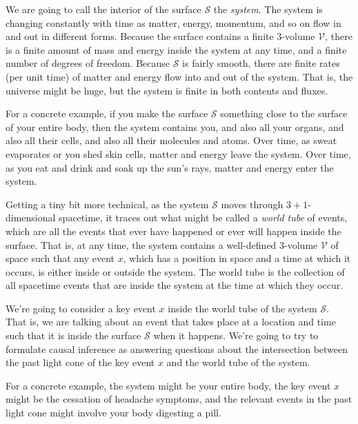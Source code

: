 \documentclass[12pt]{article}
\begin{document}
We are going to call the interior of the surface $\mathcal S$ the \emph{system}.
The system is changing constantly with time as matter, energy, momentum, and so on flow in and out in different forms.
Because the surface contains a finite 3-volume $\mathcal V$, there is a finite amount of mass and energy inside the system at any time, and a finite number of degrees of freedom.
Because $\mathcal S$ is fairly smooth, there are finite rates (per unit time) of matter and energy flow into and out of the system.
That is, the universe might be huge, but the system is finite in both contents and fluxes.

For a concrete example, if you make the surface $\mathcal S$ something close to the surface of your entire body, then the system contains you, and also all your organs, and also all their cells, and also all their molecules and atoms.
Over time, as sweat evaporates or you shed skin cells, matter and energy leave the system.
Over time, as you eat and drink and soak up the sun's rays, matter and energy enter the system.

Getting a tiny bit more technical, as the system $\mathcal S$ moves through $3+1$-dimensional spacetime, it traces out what might be called a \emph{world tube} of events, which are all the events that ever have happened or ever will happen inside the surface.
That is, at any time, the system contains a well-defined 3-volume $\mathcal V$ of space such that any event $x$, which has a position in space and a time at which it occurs, is either inside or outside the system.
The world tube is the collection of all spacetime events that are inside the system at the time at which they occur.

We're going to consider a key event $x$ inside the world tube of the system $\mathcal S$.
That is, we are talking about an event that takes place at a location and time such that it is inside the surface $\mathcal S$ when it happens.
We're going to try to formulate causal inference as answering questions about the intersection between the past light cone of the key event $x$ and the world tube of the system.

For a concrete example, the system might be your entire body, the key event $x$ might be the cessation of headache symptoms, and the relevant events in the past light cone might involve your body digesting a pill.
\end{document}
